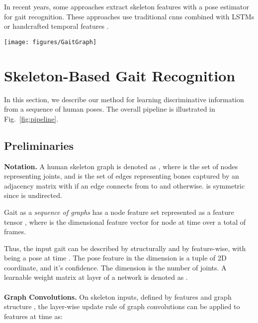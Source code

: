 \documentclass{article}
\newcommand{\nparagraph}[1]{\noindent\textbf{#1.  }}
\begin{document}
In recent years, some approaches \cite{liao2020model, an2018improving} extract skeleton features with a pose estimator for gait recognition. These approaches use traditional \glspl{cnn} combined with LSTMs \cite{an2018improving} or handcrafted temporal features \cite{liao2020model}.


\begin{figure*}[ht]
  \begin{center}
\texttt{[image: figures/GaitGraph]}
  \end{center}
  \caption{\textbf{Overview of the Pipeline.} Starting with a sequence of images, for each image a pose is estimated. The sequence of poses is then feed through the ResGCN yielding the feature embedding.}
  \label{fig:pipeline}
\end{figure*}

\section{Skeleton-Based Gait Recognition}
In this section, we describe our method for learning discriminative information from a sequence of human poses. The overall pipeline is illustrated in Fig.~\ref{fig:pipeline}.

\subsection{Preliminaries}

\nparagraph{Notation} A human skeleton graph is denoted as , where  is the set of  nodes representing joints, and  is the set of edges representing bones captured by an adjacency matrix  with  if an edge connects from  to  and  otherwise.
 is symmetric since  is undirected.

Gait as a \textit{sequence of graphs} has a node feature set  represented as a feature tensor , where  is the  dimensional feature vector for node  at time  over a total of  frames.

Thus, the input gait can be described by  structurally and by  feature-wise, with  being a pose at time . The pose feature  in the  dimension is a tuple of 2D coordinate, and it's confidence. The  dimension is the number of joints. A learnable weight matrix at layer  of a network is denoted as .\\
\\
\nparagraph{Graph Convolutions}
On skeleton inputs, defined by features  and graph structure , the layer-wise update rule of graph convolutions can be applied to features at time  as:
\end{document}
